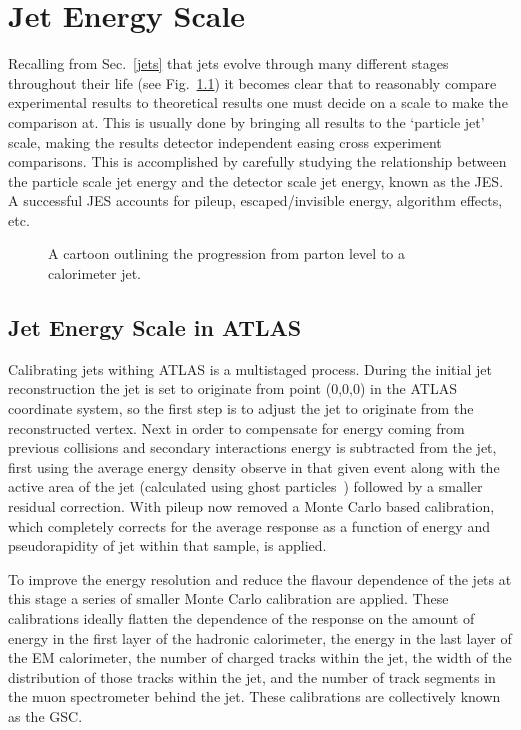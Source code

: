 \chapter{Jet Energy Scale}
\label{JES}

Recalling from Sec.~\ref{jets} that jets evolve through many different stages throughout their life (see Fig.~\ref{JetLevelsFig}) it becomes clear that to reasonably compare experimental results to theoretical results one must decide on a scale to make the comparison at.  
This is usually done by bringing all results to the `particle jet' scale, making the results detector independent easing cross experiment comparisons.  
This is accomplished by carefully studying the relationship between the particle scale jet energy and the detector scale jet energy, known as the \gls{JES}.   
A successful \gls{JES} accounts for pileup, escaped/invisible energy, algorithm effects, etc.  


\begin{figure}[!ht]
  \begin{center}
  \end{center}
  \caption[Jet showering evolution.]
      {\small A cartoon outlining the progression from parton level to a calorimeter jet.}
  \label{JetLevelsFig}
\end{figure}

\section{Jet Energy Scale in ATLAS}
\label{ATLASJES}

Calibrating jets withing ATLAS is a multistaged process.  
During the initial jet reconstruction the jet is set to originate from point (0,0,0) in the ATLAS coordinate system, so the first step is to adjust the jet to originate from the reconstructed vertex.  
Next in order to compensate for energy coming from previous collisions and secondary interactions energy is subtracted from the jet, first using the average energy density observe in that given event along with the active area of the jet (calculated using ghost particles~\cite{Soyez:2012hv}) followed by a smaller residual correction.  
With pileup now removed a Monte Carlo based calibration, which completely corrects for the average response as a function of energy and pseudorapidity of jet within that sample, is applied.  

To improve the energy resolution and reduce the flavour dependence of the jets at this stage a series of smaller Monte Carlo calibration are applied.  
These calibrations ideally flatten the dependence of the response on the amount of energy in the first layer of the hadronic calorimeter, the energy in the last layer of the EM calorimeter, the number of charged tracks within the jet, the width of the distribution of those tracks within the jet, and the number of track segments in the muon spectrometer behind the jet.  
These calibrations are collectively known as the \gls{GSC}.  


